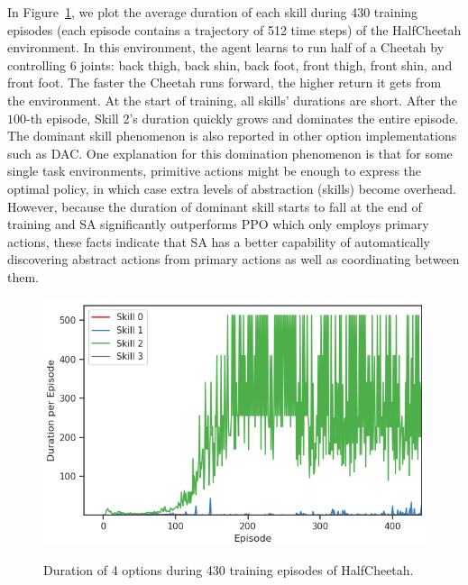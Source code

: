 In Figure~\ref{fig:duration}, we plot the average duration of
each skill during 430 training episodes (each episode contains a
trajectory of 512 time steps) of the HalfCheetah environment. In this
environment, the agent learns to run half of a Cheetah by controlling 6
joints: back thigh, back shin, back foot, front thigh, front
shin, and front foot. The faster the Cheetah runs forward, the
higher return it gets from the environment. At the start of
training, all skills' durations are short. After the $100$-th
episode, Skill 2's duration quickly grows and dominates the
entire episode. The dominant skill phenomenon is also reported in
other option implementations such as DAC. One explanation for
this domination phenomenon is that for some single task environments,
primitive actions might be enough to express the optimal policy,
in which case extra levels of abstraction (skills) become
overhead. However, because the duration of dominant skill starts
to fall at the end of training and SA significantly outperforms
PPO which only employs primary actions, these facts indicate that
SA has a better capability of automatically discovering abstract
actions from primary actions as well as coordinating between
them.
\begin{figure}[thb]
  \centering
  \includegraphics[width=0.7\linewidth]{./Part1/figures/duration.png}\\
  \caption{\label{fig:duration} Duration of 4 options during 430
    training episodes of HalfCheetah.}
\end{figure}

